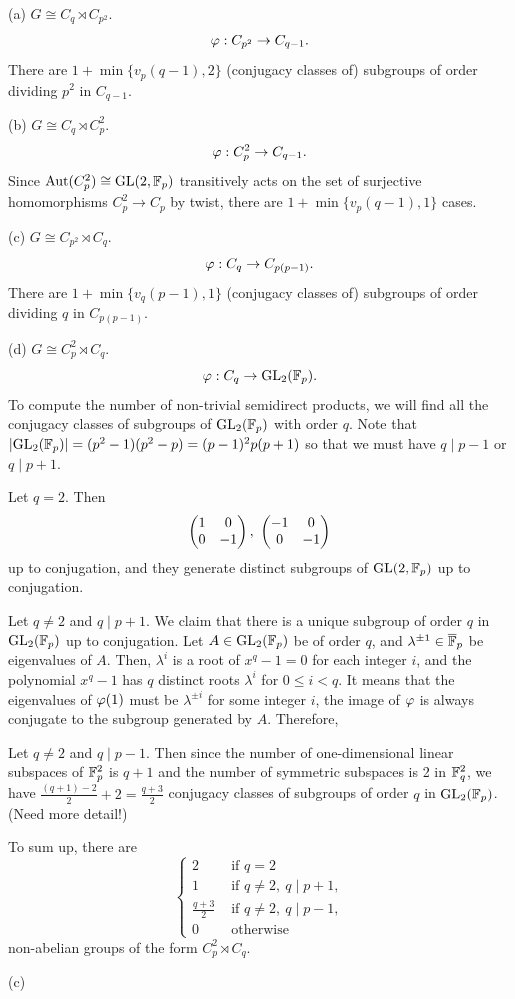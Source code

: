 \documentclass{../../large}
\begin{document}
\begin{pf}
(a) $G\cong C_q\rtimes C_{p^2}$.
\[\varphi:C_{p^2}\to C_{q-1}.\]
There are $1+\min\{v_p(q-1),2\}$ (conjugacy classes of) subgroups of order dividing $p^2$ in $C_{q-1}$.

(b) $G\cong C_q\rtimes C_p^2$.
\[\varphi:C_p^2\to C_{q-1}.\]
Since $\operatorname{Aut}(C_p^2)\cong\mathrm{GL}(2,\mathbb{F}_p)$ transitively acts on the set of surjective homomorphisms $C_p^2\to C_p$ by twist, there are $1+\min\{v_p(q-1),1\}$ cases.

(c) $G\cong C_{p^2}\rtimes C_q$.
\[\varphi:C_q\to C_{p(p-1)}.\]
There are $1+\min\{v_q(p-1),1\}$ (conjugacy classes of) subgroups of order dividing $q$ in $C_{p(p-1)}$.

(d) $G\cong C_p^2\rtimes C_q$.
\[\varphi:C_q\to\mathrm{GL}_2(\mathbb{F}_p).\]
To compute the number of non-trivial semidirect products, we will find all the conjugacy classes of subgroups of $\mathrm{GL}_2(\mathbb{F}_p)$ with order $q$.
Note that $|\mathrm{GL}_2(\mathbb{F}_p)|=(p^2-1)(p^2-p)=(p-1)^2p(p+1)$ so that we must have $q\mid p-1$ or $q\mid p+1$.

Let $q=2$.
Then
\[\mat{1&0\\0&-1},\ \mat{-1&0\\0&-1}\]
up to conjugation, and they generate distinct subgroups of $\mathrm{GL}(2,\mathbb{F}_p)$ up to conjugation.

Let $q\ne2$ and $q\mid p+1$.
We claim that there is a unique subgroup of order $q$ in $\mathrm{GL}_2(\mathbb{F}_p)$ up to conjugation.
Let $A\in\mathrm{GL}_2(\mathbb{F}_p)$ be of order $q$, and $\lambda^{\pm1}\in\overline{\mathbb{F}}_p$ be eigenvalues of $A$.
Then, $\lambda^i$ is a root of $x^q-1=0$ for each integer $i$, and the polynomial $x^q-1$ has $q$ distinct roots $\lambda^i$ for $0\le i<q$.
It means that the eigenvalues of $\varphi(1)$ must be $\lambda^{\pm i}$ for some integer $i$, the image of $\varphi$ is always conjugate to the subgroup generated by $A$.
Therefore, 

Let $q\ne2$ and $q\mid p-1$.
Then since the number of one-dimensional linear subspaces of $\mathbb{F}_p^2$ is $q+1$ and the number of symmetric subspaces is 2 in $\mathbb{F}_q^2$, we have $\frac{(q+1)-2}2+2=\frac{q+3}2$ conjugacy classes of subgroups of order $q$ in $\mathrm{GL}_2(\mathbb{F}_p)$. (Need more detail!)

To sum up, there are
\[\begin{cases}
2&\text{ if }q=2\\
1&\text{ if }q\ne2,\ q\mid p+1,\\
\frac{q+3}2&\text{ if }q\ne2,\ q\mid p-1,\\
0&\text{ otherwise }\end{cases}\]
non-abelian groups of the form $C_p^2\rtimes C_q$.


(c)

\end{pf}
\end{document}
